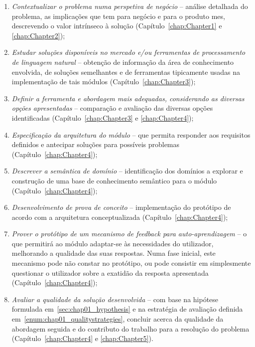 \begin{enumerate}
    \item
    {
        \textit{Contextualizar o problema numa perspetiva de negócio} -- análise detalhada do problema, as implicações que tem para negócio e para o produto \gls{mes}, descrevendo o valor intrínseco à solução (Capítulo~\ref{chap:Chapter1} e \ref{chap:Chapter2});
    }
    \item
    {
        \textit{Estudar soluções disponíveis no mercado e/ou ferramentas de processamento de linguagem natural} -- obtenção de informação da área de conhecimento envolvida, de soluções semelhantes e de ferramentas tipicamente usadas na implementação de tais módulos (Capítulo~\ref{chap:Chapter3});
    }
    \item
    {
        \textit{Definir a ferramenta e abordagem mais adequadas, considerando as diversas opções apresentadas} -- comparação e avaliação das diversas opções identificadas (Capítulo~\ref{chap:Chapter3} e \ref{chap:Chapter4});
    }
    \item
    {
        \textit{Especificação da arquitetura do módulo} -- que permita responder aos requisitos definidos e antecipar soluções para possíveis problemas (Capítulo~\ref{chap:Chapter4});
    }
    \item
    {
        \textit{Descrever a semântica de domínio} -- identificação dos domínios a explorar e construção de uma base de conhecimento semântico para o módulo (Capítulo~\ref{chap:Chapter4});
    }
    \item
    {
        \textit{Desenvolvimento de prova de conceito} -- implementação do protótipo de acordo com a arquitetura conceptualizada (Capítulo~\ref{chap:Chapter4});
    }
    \item
    {
        \textit{Prover o protótipo de um mecanismo de feedback para auto-aprendizagem} -- o que permitirá ao módulo adaptar-se às necessidades do utilizador, melhorando a qualidade das suas respostas. Numa fase inicial, este mecanismo pode não constar no protótipo, ou pode consistir em simplesmente questionar o utilizador sobre a exatidão da resposta apresentada (Capítulo~\ref{chap:Chapter4});
    }
    \item
    {
        \textit{Avaliar a qualidade da solução desenvolvida} -- com base na hipótese formulada em~\ref{sec:chap01_hypothesis} e na estratégia de avaliação definida em~\ref{enum:chap01_qualitystrategies}, concluir acerca da qualidade da abordagem seguida e do contributo do trabalho para a resolução do problema (Capítulo~\ref{chap:Chapter4} e \ref{chap:Chapter5}).
    }
\end{enumerate}


